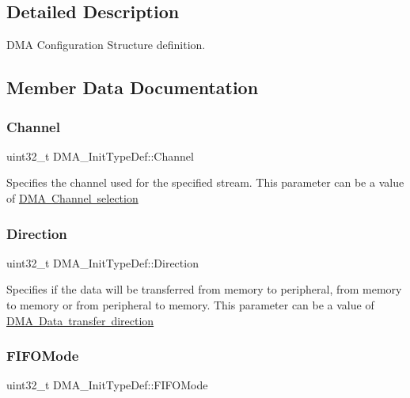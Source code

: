 \subsection{Detailed Description}
D\+MA Configuration Structure definition. 

\subsection{Member Data Documentation}
\mbox{\label{struct_d_m_a___init_type_def_af62608eb25864208cae5d59acef282a6}} 
\subsubsection{\texorpdfstring{Channel}{Channel}}
{\footnotesize\ttfamily uint32\+\_\+t D\+M\+A\+\_\+\+Init\+Type\+Def\+::\+Channel}

Specifies the channel used for the specified stream. This parameter can be a value of \mbox{\hyperlink{group___d_m_a_ex___channel__selection}{D\+MA Channel selection}} \mbox{\label{struct_d_m_a___init_type_def_a0145b5d0e074fa8e2e185ecf2c4a15ca}} 
\subsubsection{\texorpdfstring{Direction}{Direction}}
{\footnotesize\ttfamily uint32\+\_\+t D\+M\+A\+\_\+\+Init\+Type\+Def\+::\+Direction}

Specifies if the data will be transferred from memory to peripheral, from memory to memory or from peripheral to memory. This parameter can be a value of \mbox{\hyperlink{group___d_m_a___data__transfer__direction}{D\+MA Data transfer direction}} \mbox{\label{struct_d_m_a___init_type_def_acda0396cf55baab166f51b1ea1deed0d}} 
\subsubsection{\texorpdfstring{FIFOMode}{FIFOMode}}
{\footnotesize\ttfamily uint32\+\_\+t D\+M\+A\+\_\+\+Init\+Type\+Def\+::\+F\+I\+F\+O\+Mode}

